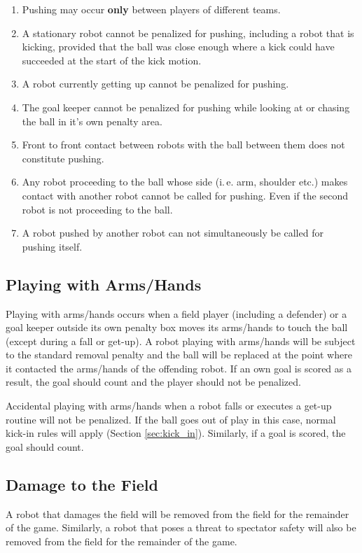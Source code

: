 \documentclass[12pt]{article}
\newcommand{\ie}{\mbox{i.\,e.}\xspace}
\begin{document}
\begin{enumerate}
	\item Pushing may occur \textbf{only} between players of different teams.
	\item A stationary robot cannot be penalized for pushing, including a robot that is kicking, provided that the ball was close enough where a kick could have succeeded at the start of the kick motion.
	\item A robot currently getting up cannot be penalized for pushing.
	\item The goal keeper cannot be penalized for pushing while looking at or chasing the ball in it's own penalty area.
	\item Front to front contact between robots with the ball between them does not constitute pushing.
	\item Any robot proceeding to the ball whose side (\ie arm, shoulder etc.) makes contact with another robot cannot be called for pushing. Even if the second robot is not proceeding to the ball.
	\item A robot pushed by another robot can not simultaneously be called for pushing itself.
\end{enumerate}

\subsection{Playing with Arms/Hands}
\label{sec:hand_ball}

Playing with arms/hands occurs when a field player (including a defender) or a goal keeper outside its own penalty box moves its arms/hands to touch the ball (except during a fall or get-up). A robot playing with arms/hands will be subject to the standard removal penalty and the ball will be replaced at the point where it contacted the arms/hands of the offending robot.  If an own goal is scored as a result, the goal should count and the player should not be penalized.

Accidental playing with arms/hands when a robot falls or executes a get-up routine will not be penalized. If the ball goes out of play in this case, normal kick-in rules will apply (Section \ref {sec:kick_in}). Similarly, if a goal is scored, the goal should count.


\subsection{Damage to the Field}
\label{sec:damage}
A robot that damages the field will be removed from the field for the remainder of the game. Similarly, a robot that poses a threat to spectator safety will also be removed from the field for the remainder of the game.
\end{document}
